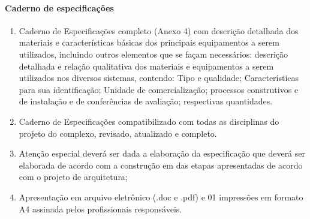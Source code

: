 \paragraph{Caderno de especificações}
	\begin{enumerate}

		\item Caderno de Especificações completo (Anexo 4) com descrição detalhada dos materiais e características básicas dos principais equipamentos a serem utilizados, incluindo outros elementos que se façam necessários: descrição detalhada e relação qualitativa dos materiais e equipamentos a serem utilizados nos diversos sistemas, contendo: Tipo e qualidade; Características para sua identificação; Unidade de comercialização; processos construtivos e de instalação e de conferências de avaliação; respectivas quantidades.

		\item Caderno de Especificações compatibilizado com todas as disciplinas do projeto do complexo, revisado, atualizado e completo.

		\item Atenção especial deverá ser dada a elaboração da especificação que deverá ser elaborada de acordo com a construção em das etapas apresentadas de acordo com o projeto de arquitetura;

		\item Apresentação em arquivo eletrônico (.doc e .pdf) e 01 impressões em formato A4 assinada pelos profissionais responsáveis.
	\end{enumerate}

